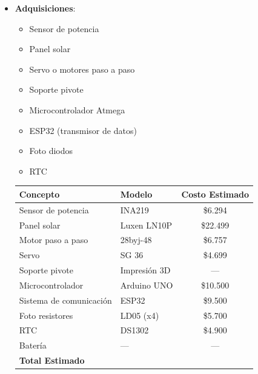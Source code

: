 \documentclass[a4paper,12pt]{article}
\begin{document}
\begin{itemize}
    \item \textbf{Adquisiciones}: 
    \begin{itemize}
        \item Sensor de potencia
        \item Panel solar
        \item Servo o motores paso a paso
        \item Soporte pivote
        \item Microcontrolador Atmega
        \item ESP32 (transmisor de datos)
        \item Foto diodos
        \item RTC
    \end{itemize}

    \begin{table}[h!]
        \centering
        \begin{tabular}{|l|l|c|}
            \hline
            Concepto & Modelo & Costo Estimado \\ 
            \hline
            Sensor de potencia & INA219 & \$6.294 \\
            Panel solar & Luxen LN10P & \$22.499 \\
            Motor paso a paso & 28byj-48 & \$6.757 \\
            Servo & SG 36 & \$4.699 \\
            Soporte pivote & Impresión 3D & --- \\
            Microcontrolador & Arduino UNO & \$10.500 \\
            Sistema de comunicación & ESP32 & \$9.500 \\
            Foto resistores & LD05 (x4) & \$5.700 \\
            RTC & DS1302 & \$4.900 \\
            Batería & --- & --- \\
            \hline
            \textbf{Total Estimado} & & \\
            \hline
        \end{tabular}
    \end{table}
\end{itemize}
\end{document}
